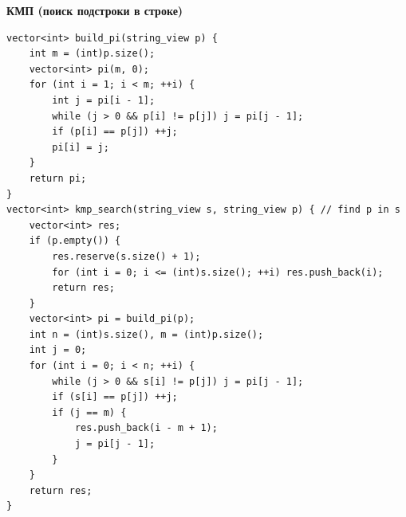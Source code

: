 \documentclass[a4paper, 10pt]{article}
\begin{document}
{\Large \textbf{КМП (поиск подстроки в строке)}}
\begin{lstlisting}
vector<int> build_pi(string_view p) {
    int m = (int)p.size();
    vector<int> pi(m, 0);
    for (int i = 1; i < m; ++i) {
        int j = pi[i - 1];
        while (j > 0 && p[i] != p[j]) j = pi[j - 1];
        if (p[i] == p[j]) ++j;
        pi[i] = j;
    }
    return pi;
}
vector<int> kmp_search(string_view s, string_view p) { // find p in s
    vector<int> res;
    if (p.empty()) {
        res.reserve(s.size() + 1);
        for (int i = 0; i <= (int)s.size(); ++i) res.push_back(i);
        return res;
    }
    vector<int> pi = build_pi(p);
    int n = (int)s.size(), m = (int)p.size();
    int j = 0;
    for (int i = 0; i < n; ++i) {
        while (j > 0 && s[i] != p[j]) j = pi[j - 1];
        if (s[i] == p[j]) ++j;
        if (j == m) {
            res.push_back(i - m + 1);
            j = pi[j - 1];
        }
    }
    return res;
}
\end{lstlisting}
\end{document}

